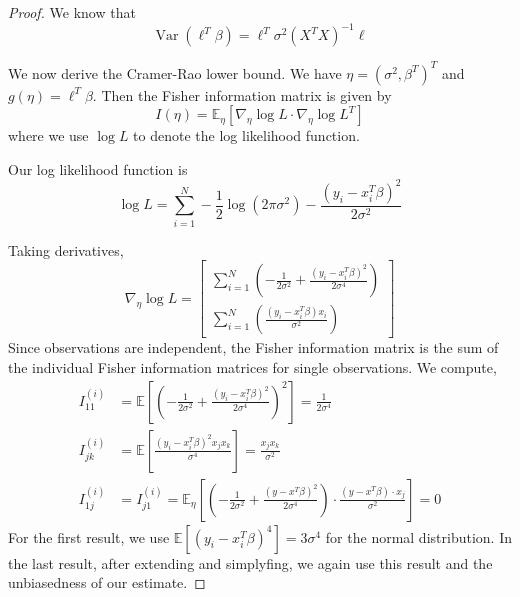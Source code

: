 \documentclass[11pt, %
	oneside, %
	english, %
	onehalfspacing, %
	]{article} %
\numberwithin{equation}{section}
\begin{document}
\begin{proof}
    We know that
    \begin{equation}\label{eq:var_ols}
        \operatorname{Var} \left( \ell^T \beta\right) = \ell^T \sigma^2 (X^TX)^{-1}  \ell
    \end{equation}

    We now derive the Cramer-Rao lower bound. We have $\eta = (\sigma^2, \beta^T)^T$ and $g(\eta)=\ell^T \beta$. Then the Fisher information matrix is given by
    $$
    I(\eta) = \mathbb{E}_\eta \left[ \nabla_\eta \log L \cdot \nabla_\eta \log L^T \right]
    $$
    where we use $\log L$ to denote the log likelihood function.

    Our log likelihood function is
    \begin{equation*}
        \log L=\sum_{i=1}^{N} -\frac{1}{2} \log \left(2 \pi \sigma^2\right)-\frac{\left(y_i-x_i^T \beta\right)^2}{2 \sigma^2}
    \end{equation*}


    Taking derivatives,
    \begin{equation}\label{eq.pardev}
        \nabla_\eta \log L=
        \begin{bmatrix}
            \sum_{i=1}^N\left(-\frac{1}{2 \sigma^2}+\frac{\left(y_i-x_i^T \beta\right)^2}{2 \sigma^4}\right) \\
            \sum_{i=1}^N\left(\frac{\left(y_i-x_i^T \beta\right) x_i}{\sigma^2}\right)
        \end{bmatrix}
    \end{equation}
    Since observations are independent, the Fisher information matrix is the sum of the individual Fisher information matrices for single observations. We compute,
    $$
    \begin{aligned}
        I_{11}^{(i)}&=\mathbb{E}\left[\left(-\frac{1}{2 \sigma^2}+\frac{\left(y_i-x_i^T \beta\right)^2}{2 \sigma^4}\right)^2\right]=\frac{1}{2 \sigma^4} \\
        I_{j k}^{(i)}&=\mathbb{E}\left[\frac{\left(y_i-x_i^T \beta\right)^2 x_j x_k}{\sigma^4}\right]=\frac{x_j x_k}{\sigma^2} \\
        I_{1 j}^{(i)}&=I_{j 1}^{(i)}=\mathbb{E}_\eta\left[\left(-\frac{1}{2 \sigma^2}+\frac{\left(y-x^T \beta\right)^2}{2 \sigma^4}\right) \cdot \frac{\left(y-x^T \beta\right) \cdot x_j}{\sigma^2}\right]=0
    \end{aligned}
    $$
    For the first result, we use $\mathbb{E}\left[\left(y_i-x_i^T \beta\right)^4\right]=3 \sigma^4$ for the normal distribution. In the last result, after extending and simplyfing, we again use this result and the unbiasedness of our estimate.


\end{proof}
\end{document}
